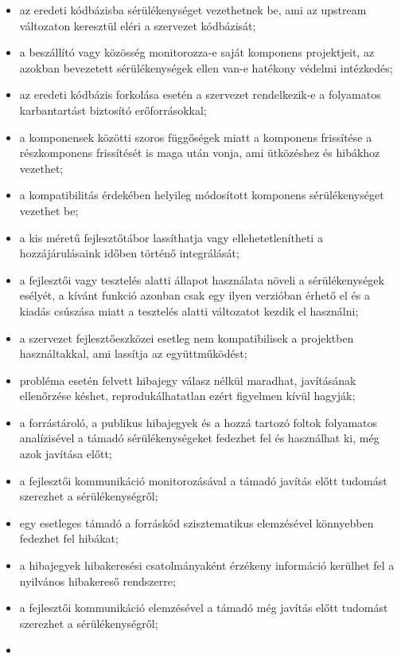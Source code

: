 \documentclass[12pt,magyar,a4paper,oneside]{scrreprt}
\providecommand{\tightlist}{%
  \setlength{\itemsep}{0pt}\setlength{\parskip}{0pt}}
\begin{document}
\begin{itemize}
\tightlist
\item
  az eredeti kódbázisba sérülékenységet vezethetnek be, ami az upstream
  változaton keresztül eléri a szervezet kódbázisát;
\item
  a beszállító vagy közösség monitorozza-e saját komponens projektjeit,
  az azokban bevezetett sérülékenységek ellen van-e hatékony védelmi
  intézkedés;
\item
  az eredeti kódbázis forkolása esetén a szervezet rendelkezik-e a
  folyamatos karbantartást biztosító erőforrásokkal;
\item
  a komponensek közötti szoros függőségek miatt a komponens frissítése a
  részkomponens frissítését is maga után vonja, ami ütközéshez és
  hibákhoz vezethet;
\item
  a kompatibilitás érdekében helyileg módosított komponens
  sérülékenységet vezethet be;
\item
  a kis méretű fejlesztőtábor lassíthatja vagy ellehetetlenítheti a
  hozzájárulásaink időben történő integrálását;
\item
  a fejlesztői vagy tesztelés alatti állapot használata növeli a
  sérülékenységek esélyét, a kívánt funkció azonban csak egy ilyen
  verzióban érhető el és a kiadás csúszása miatt a tesztelés alatti
  változatot kezdik el használni;
\item
  a szervezet fejlesztőeszközei esetleg nem kompatibilisek a projektben
  használtakkal, ami lassítja az együttműködést;
\item
  probléma esetén felvett hibajegy válasz nélkül maradhat, javításának
  ellenőrzése késhet, reprodukálhatatlan ezért figyelmen kívül hagyják;
\item
  a forrástároló, a publikus hibajegyek és a hozzá tartozó foltok
  folyamatos analízisével a támadó sérülékenységeket fedezhet fel és
  használhat ki, még azok javítása előtt;
\item
  a fejlesztői kommunikáció monitorozásával a támadó javítás előtt
  tudomást szerezhet a sérülékenységről;
\item
  egy esetleges támadó a forráskód szisztematikus elemzésével könnyebben
  fedezhet fel hibákat;
\item
  a hibajegyek hibakeresési csatolmányaként érzékeny információ kerülhet
  fel a nyilvános hibakereső rendszerre;
\item
  a fejlesztői kommunikáció elemzésével a támadó még javítás előtt
  tudomást szerezhet a sérülékenységről;
\item

\end{itemize}
\end{document}
